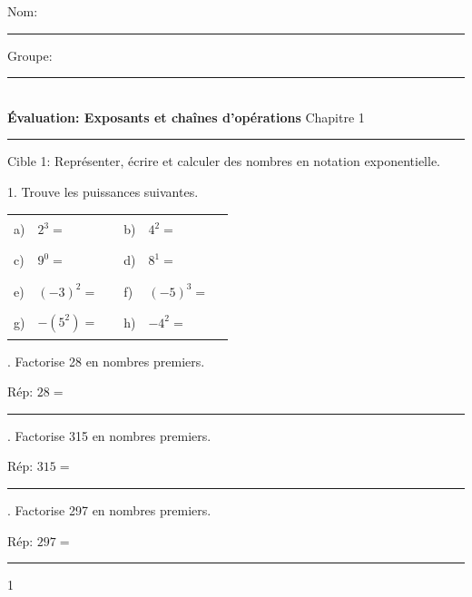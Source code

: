\documentclass[11pt]{article}
\newcommand{\entete}{%
  \noindent Nom: \rule{6.5cm}{0.4pt} \hfill Groupe: \rule{3cm}{0.4pt}\\[4mm]
}
\begin{document}
\entete
\noindent \textbf{Évaluation: Exposants et chaînes d'opérations} \hfill Chapitre 1
\vspace{2mm}
\hrule
\vspace{4mm}

\begin{cible}{Cible 1: Représenter, écrire et calculer des nombres en notation exponentielle.}

1. Trouve les puissances suivantes.
\vspace{2mm}

\begin{tabular}{@{}p{0.5cm}p{2.3cm}p{4.3cm}p{0.5cm}p{2.3cm}p{4.3cm}@{}}
a) & $2^3 = $ & \rule{3.2cm}{0.4pt} & b) & $4^2 = $ & \rule{3.2cm}{0.4pt} \\[4mm]
c) & $9^0 = $ & \rule{3.2cm}{0.4pt} & d) & $8^1 = $ & \rule{3.2cm}{0.4pt} \\[4mm]
e) & $(-3)^2 = $ & \rule{3.2cm}{0.4pt} & f) & $(-5)^3 = $ & \rule{3.2cm}{0.4pt} \\[4mm]
g) & $-(5^2) = $ & \rule{3.2cm}{0.4pt} & h) & $-4^2 = $ & \rule{3.2cm}{0.4pt} \\
\end{tabular}

\vspace{6mm}
. Factorise 28 en nombres premiers.

\vspace{2.5cm}

\noindent Rép: $28 = $ \rule{3.5cm}{0.4pt}


\vspace{6mm}
. Factorise 315 en nombres premiers.

\vspace{2.5cm}

\noindent Rép: $315 = $ \rule{3.5cm}{0.4pt}

\vspace{6mm}

. Factorise 297 en nombres premiers.

\vspace{2.5cm}

\noindent Rép: $297 = $ \rule{3.5cm}{0.4pt}
\vspace{4mm}
\end{cible}

\vfill
\begin{center}
1
\end{center}

\newpage
\end{document}
